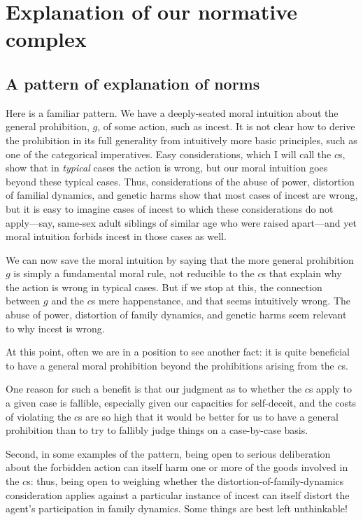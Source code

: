 \section{Explanation of our normative complex}
\subsection{A pattern of explanation of norms}\label{sec:moral-explanation}
Here is a familiar pattern. We have a deeply-seated moral intuition about the general prohibition, $g$, of some action,
such as incest. It is not clear how to derive the prohibition in its full generality from intuitively more basic principles, such as one of 
the categorical imperatives. Easy considerations, which I will call the $c$s, show that in \textit{typical} cases the action is wrong,
but our moral intuition goes beyond these typical cases. Thus, considerations of the abuse of power, distortion of 
familial dynamics, and genetic harms show that most cases of incest are wrong, but it is easy to imagine cases
of incest to which these considerations do not apply---say, same-sex adult siblings of similar age who were raised 
apart---and yet moral intuition forbids incest in those cases as well.

We can now save the moral intuition by saying that the more general prohibition $g$ is simply a fundamental moral rule,
not reducible to the $c$s that explain why the action is wrong in typical cases. But if we stop
at this, the connection between $g$ and the $c$s mere happenstance, and that seems intuitively wrong. The abuse of 
power, distortion of family dynamics, and genetic harms seem relevant to why incest is wrong.

At this point, often we are in a position to see another fact: it is quite beneficial to have a 
general moral prohibition beyond the prohibitions arising from the $c$s. 

One reason for such a benefit is that our judgment as to whether the $c$s apply to a given case is fallible, especially given our capacities
for self-deceit, and the costs of violating the $c$s are so high that it would be better for us to have a 
general prohibition than to try to fallibly judge things on a case-by-case basis. 

Second, in some examples of
the pattern, being open to serious deliberation about the forbidden action can itself harm one or more of the goods
involved in the $c$s: thus, being open to weighing whether the distortion-of-family-dynamics consideration
applies against a particular instance of incest can itself distort the agent's participation in family
dynamics. Some things are best left unthinkable!


